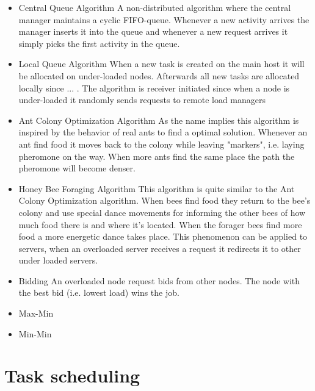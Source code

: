 \documentclass{cslthse-msc}
\begin{document}
\begin{itemize}
\item Central Queue Algorithm A non-distributed algorithm where the central manager maintains a cyclic FIFO-queue. Whenever a new activity arrives the manager inserts it into the queue and whenever a new request arrives it simply picks the first activity in the queue. 

\item Local Queue Algorithm When a new task is created on the main host it will be allocated on under-loaded nodes. Afterwards all new tasks are allocated locally since ... \cite{perfAnalysisLoadCloud}. The algorithm is receiver initiated since when a node is under-loaded it randomly sends requests to remote load managers

\item Ant Colony Optimization Algorithm As the name implies this algorithm is inspired by the behavior of real ants to find a optimal solution. Whenever an ant find food it moves back to the colony while leaving "markers", i.e. laying pheromone on the way. When more ants find the same place the path the pheromone will become denser. 

\item Honey Bee Foraging Algorithm This algorithm is quite similar to the Ant Colony Optimization algorithm. When bees find food they return to the bee's colony and use special dance movements for informing the other bees of how much food there is and where it's located. When the forager bees find more food a more energetic dance takes place. This phenomenon can be applied to servers, when an overloaded server receives a request it redirects it to other under loaded servers.


\item Bidding An overloaded node request bids from other nodes. The node with the best bid (i.e. lowest load) wins the job.

\item Max-Min 

\item Min-Min 
\end{itemize}


\section{Task scheduling}
\end{document}

